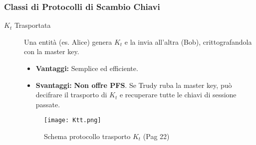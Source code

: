 \documentclass[../main.tex]{subfiles}
\begin{document}
\subsubsection{Classi di Protocolli di Scambio Chiavi}
\begin{description}
    \item[$K_t$ Trasportata]
    Una entità (es. Alice) genera $K_t$ e la invia all'altra (Bob), crittografandola con la master key.
    \begin{itemize}
        \item \textbf{Vantaggi:} Semplice ed efficiente.
        \item \textbf{Svantaggi:} \textbf{Non offre PFS}. Se Trudy ruba la master key, può decifrare il trasporto di $K_t$ e recuperare tutte le chiavi di sessione passate.
    \end{itemize}
    \begin{figure}[H]
      \centering
      \texttt{[image: Ktt.png]}
      \caption{Schema protocollo trasporto $K_t$ (Pag 22)}
      \label{fig:Ktt}
    \end{figure}


\end{description}
\end{document}
